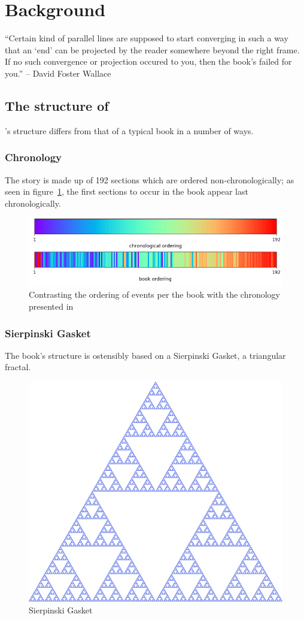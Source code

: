 \section{Background}

``Certain kind of parallel lines are supposed to start converging in such a way that an `end' can be projected by the reader somewhere beyond the right frame. If no such convergence or projection occured to you, then the book's failed for you.'' -- David Foster Wallace \cite{badger_internet_1996}

\subsection{The structure of \infinitejest}

\infinitejest's structure differs from that of a typical book in a number of ways.

\subsubsection{Chronology}

The story is made up of 192 sections which are ordered non-chronologically; as seen in figure~\ref{chronology_bars}, the first sections to occur in the book appear last chronologically.

\begin{figure}[ht]
    \centering
    \includegraphics[width=.5\textwidth]{../data/plots/section_bars.png}
    \caption{Contrasting the ordering of events per the book with the chronology presented in \cite{carlisle_2007}}
    \label{chronology_bars}
\end{figure}

\subsubsection{Sierpinski Gasket}

The book's structure is ostensibly based on a Sierpinski Gasket, a triangular fractal.

\begin{figure}[ht]
    \centering
    \includegraphics[width=.25\textwidth]{images/sierpinski.png}
    \caption{Sierpinski Gasket}
    \label{Sierpinski Gasket}
\end{figure}

